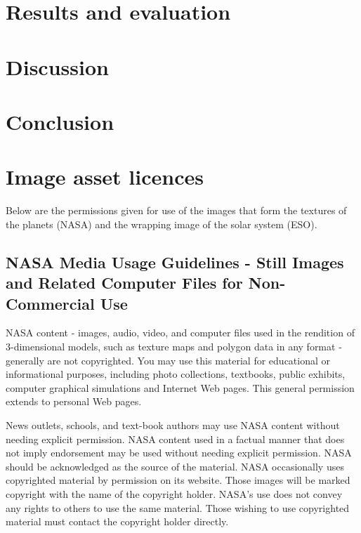 \documentclass[twoside]{bhamthesis}
\begin{document}
\section{Results and evaluation}



\section{Discussion}



\section{Conclusion}



\printbibliography

\appendix
\appendixpage
\addappheadtotoc

\section{Image asset licences}

Below are the permissions given for use of the images that form the textures of the planets (NASA) and the wrapping image of the solar system (ESO).

\subsection{NASA Media Usage Guidelines - Still Images and Related Computer Files for Non-Commercial Use}

NASA content - images, audio, video, and computer files used in the rendition of 3-dimensional models, such as texture maps and polygon data in any format - generally are not copyrighted. You may use this material for educational or informational purposes, including photo collections, textbooks, public exhibits, computer graphical simulations and Internet Web pages. This general permission extends to personal Web pages.

News outlets, schools, and text-book authors may use NASA content without needing explicit permission. NASA content used in a factual manner that does not imply endorsement may be used without needing explicit permission. NASA should be acknowledged as the source of the material. NASA occasionally uses copyrighted material by permission on its website. Those images will be marked copyright with the name of the copyright holder. NASA's use does not convey any rights to others to use the same material. Those wishing to use copyrighted material must contact the copyright holder directly.
\end{document}
